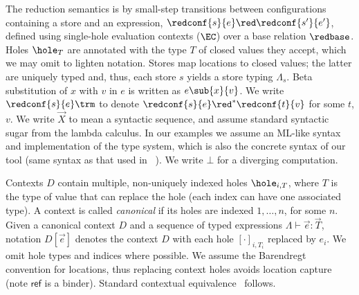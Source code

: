 The reduction semantics is by small-step transitions between configurations containing a store and an expression, $\redconf{s}{e} \red \redconf{s'}{e'}$,
defined using single-hole evaluation contexts ($\EC$) over a base relation $\redbase$.
Holes $\hole_T$ are annotated with the type $T$ of closed values they accept, which we may omit to lighten notation.
Stores map locations to closed values; the latter are uniquely typed and, thus, each store $s$ yields a store typing $\Lambda_s$.
Beta substitution of $x$ with $v$ in $e$ is written as $e\sub{x}{v}$.
We write $\redconf{s}{e}\trm$ to denote $\redconf{s}{e} \red^* \redconf{t}{v}$ for some $t$, $v$.
We write $\vec X$ to mean a syntactic sequence, and assume standard syntactic sugar from the lambda calculus.
In our examples we assume an ML-like syntax and implementation of the type system, which is also the concrete
syntax of our tool (same syntax as that used in \Hobbit~\cite{KoutavasLT22}).
We write $\bot$ for a diverging computation.



Contexts $D$ contain multiple, non-uniquely indexed holes $\hole_{i,T}$, where $T$ is the type of value that can replace the hole (each index can have one associated type).
A context is called \emph{canonical} if its holes are indexed $1,\dots,n$, for some $n$.
Given a canonical context $D$ and a sequence of typed expressions $\Lambda\vdash\vec e:\vec T$, notation $D[\vec e]$ denotes the context $D$ with each hole $[\cdot]_{i,T_i}$ replaced by $e_i$.
We omit hole types and indices where possible.
We assume the Barendregt convention for locations, thus replacing context holes avoids location capture (note $\mathsf{ref}$ is a binder).
%
Standard contextual equivalence~\cite{Morris68} follows.

